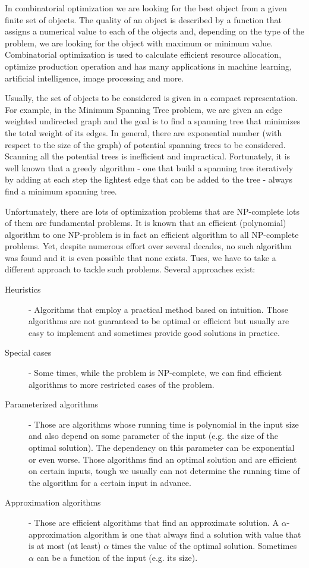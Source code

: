 In combinatorial optimization we are looking for the best object from a given finite set of
objects.
The quality of an object is described by a function
that assigns a numerical value to each of the objects and,
depending on the type of the problem,
we are looking for the object with maximum or minimum value.
Combinatorial optimization is used to calculate efficient resource allocation, optimize production operation and has many applications in machine learning, artificial intelligence, image processing and more.

Usually, the set of objects to be considered is given in a compact representation.
For example, in the Minimum Spanning Tree problem, we are given an
edge weighted undirected graph and the goal is to find a spanning tree that minimizes
the total weight of its edges.
In general, there are exponential number (with respect to the size of the graph)
of potential spanning trees to be considered.
Scanning all the potential trees is inefficient and impractical.
Fortunately, it is well known that a greedy algorithm -
one that build a spanning tree iteratively by adding at each step the lightest edge that can be added to the tree -
always find a minimum spanning tree.

Unfortunately, there are lots of optimization problems that are NP-complete lots of them are fundamental problems.
It is known that an efficient (polynomial) algorithm to one NP-problem is in fact an efficient algorithm to all NP-complete problems.
Yet, despite numerous effort over several decades, no such algorithm was found and it is even possible that none exists.
Tues, we have to take a different approach to tackle such problems.
Several approaches exist:
\begin{description}
\item[Heuristics] - Algorithms that employ a practical method based on intuition.
Those algorithms are not guaranteed to be optimal or efficient but usually are easy to implement and sometimes provide good solutions in practice.

\item[Special cases] - Some times, while the problem is NP-complete, we can find efficient algorithms to more restricted cases of the problem.

\item[Parameterized algorithms] - Those are algorithms whose running time is polynomial in the input size and also depend on some parameter of the input (e.g. the size of the optimal solution).
The dependency on this parameter can be exponential or even worse.
Those algorithms find an optimal solution and are efficient on certain inputs, tough we usually can not determine the running time of the algorithm for a certain input in advance.

\item[Approximation algorithms] - Those are efficient algorithms that find an approximate solution.
A $\alpha$-approximation algorithm is one that always find a solution with value that is at most (at least) $\alpha$ times the value of the optimal solution.
Sometimes $\alpha$ can be a function of the input (e.g. its size).
\end{description}

